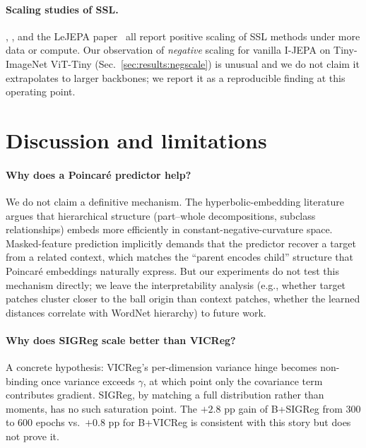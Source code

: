 \documentclass{article}
\begin{document}
\paragraph{Scaling studies of SSL.}
\citet{goyal2022vision}, \citet{oquab2024dinov2}, and the LeJEPA paper~\citep{ball2025lejepa} all report positive scaling of SSL methods under more data or compute. Our observation of \emph{negative} scaling for vanilla I-JEPA on Tiny-ImageNet ViT-Tiny (Sec.~\ref{sec:results:negscale}) is unusual and we do not claim it extrapolates to larger backbones; we report it as a reproducible finding at this operating point.

\section{Discussion and limitations}
\label{sec:discussion}

\paragraph{Why does a Poincar\'{e} predictor help?}
We do not claim a definitive mechanism. The hyperbolic-embedding literature argues that hierarchical structure (part--whole decompositions, subclass relationships) embeds more efficiently in constant-negative-curvature space. Masked-feature prediction implicitly demands that the predictor recover a target from a related context, which matches the ``parent encodes child'' structure that Poincar\'{e} embeddings naturally express. But our experiments do not test this mechanism directly; we leave the interpretability analysis (e.g., whether target patches cluster closer to the ball origin than context patches, whether the learned distances correlate with WordNet hierarchy) to future work.

\paragraph{Why does SIGReg scale better than VICReg?}
A concrete hypothesis: VICReg's per-dimension variance hinge becomes non-binding once variance exceeds $\gamma$, at which point only the covariance term contributes gradient. SIGReg, by matching a full distribution rather than moments, has no such saturation point. The $+2.8$ pp gain of B+SIGReg from 300 to 600 epochs vs.\ $+0.8$ pp for B+VICReg is consistent with this story but does not prove it.
\end{document}
